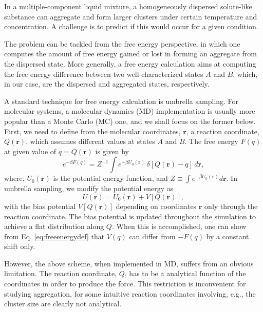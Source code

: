 \documentclass{article}
\newcommand{\vct}[1]{\mathbf{#1}}
\newcommand{\vr}{\vct{r}}
\begin{document}
%
In a multiple-component liquid mixture,
a homogeneously dispersed solute-like substance
can aggregate and form larger clusters
under certain temperature and concentration.
%
A challenge is to predict if this would occur
for a given condition.



%
The problem can be tackled
from the free energy perspective,
%
in which one computes
the amount of free energy gained or lost
in forming an aggregate from the dispersed state.
%
More generally,
a free energy calculation
aims at computing the free energy difference
between two well-characterized states $A$ and $B$,
which, in our case,
are the dispersed and aggregated states, respectively.


%
A standard technique for free energy calculation is
umbrella sampling.
%
For molecular systems,
a molecular dynamics (MD) implementation
is usually more popular than
a Monte Carlo (MC) one,
and we shall focus on the former below.
%
First,
we need to define
from the molecular coordinates, $\vr$,
a reaction coordinate, $Q(\vr)$,
which assumes different values
at states $A$ and $B$.
%
The free energy $F(q)$
at given value of $q = Q(\vr)$
is given by
%
\begin{equation}
e^{-\beta F(q)}
=
Z^{-1}
\int
  e^{-\beta U_0(\vr)} \,
  \delta[Q(\vr) - q] \,
  d\vr,
\label{eq:freeenergydef}
\end{equation}
%
where,
$U_0(\vr)$
is the potential energy function,
and
$Z \equiv \int e^{-\beta U_0(\vr)} d\vr$.
%
In umbrella sampling,
we modify the potential energy as
%
\begin{equation}
U(\vr)
=
U_0(\vr)
+
V[Q(\vr)],
\end{equation}
%
with the bias potential
$V[Q(\vr)]$
depending on coordinates $\vr$
only through the reaction coordinate.
%
The bias potential
is updated throughout the simulation
to achieve a flat distribution along $Q$.
%
When this is accomplished,
one can show from Eq. \eqref{eq:freeenergydef}
that $V(q)$ can differ from $-F(q)$
by a constant shift only.



%
However, the above scheme, when implemented in MD,
suffers from an obvious limitation.
%
The reaction coordinate, $Q$,
has to be a analytical function of the coordinates
in order to produce the force.
%
This restriction is inconvenient
for studying aggregation,
for some intuitive reaction coordinates
involving, e.g., the cluster size
are clearly not analytical.
\end{document}
